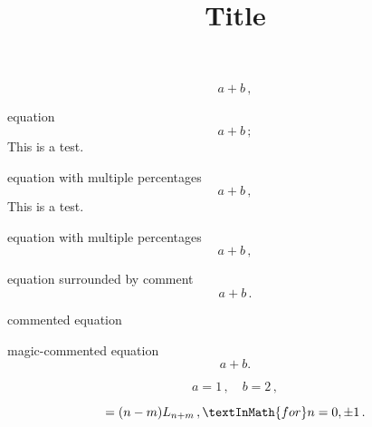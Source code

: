 \documentclass[12pt]{article}
\title{Title}
\author{}
\date{}
\begin{document}

%
\begin{equation}
    a+b
    \, ,
\end{equation}
%

equation
%
\begin{equation}
    a+b
    \, ;
\end{equation}
%
This is a test.

equation with multiple percentages
%
\begin{equation}
    a+b
    \, ,
\end{equation}
%
This is a test.

equation with multiple percentages
%
\begin{equation}
    a+b
    \, ,
\end{equation}
%

equation surrounded by comment
%
\begin{equation}
    a+b
    \, .
\end{equation}
%

commented equation

magic-commented equation
%
\begin{equation}
    a+b.
\end{equation}
%

%
\begin{equation}
    a=1
    \, ,
    \quad b=2
    \, ,
\end{equation}
%

%
\begin{equation}
    [L_n,L_m]=(n-m)L_{n+m}
    \, ,
    \textInMath{for}
    n=0,\pm 1
    \, .
\end{equation}
%
\end{document}
